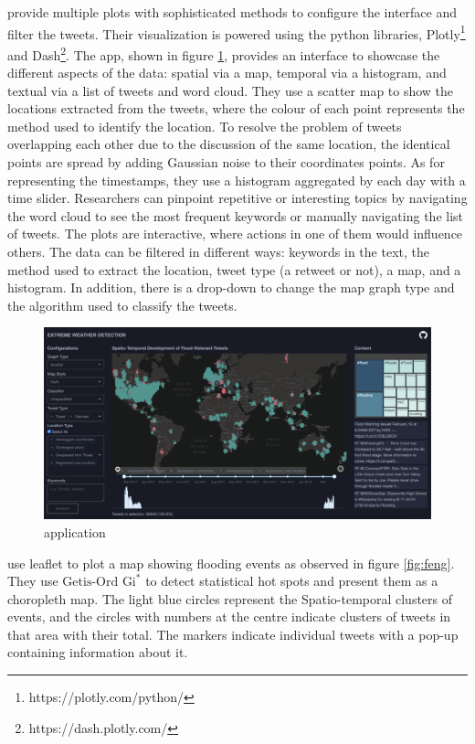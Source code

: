  provide multiple plots with sophisticated
methods to configure the interface and filter the tweets. Their visualization is powered using the python
libraries, Plotly\footnote{https://plotly.com/python/} and Dash\footnote{https://dash.plotly.com/}.
The app, shown in figure \ref{fig:peter}, provides an interface to showcase the different aspects of the
data: spatial via a map, temporal via a histogram, and textual via a list of tweets and word cloud.
They use a scatter map to show the locations extracted from the tweets, where the colour of each
point represents the method used to identify the location. To resolve the problem of tweets
overlapping each other due to the discussion of the same location, the identical points are
spread by adding Gaussian noise to their coordinates points. As for representing the timestamps,
they use a histogram aggregated by each day with a time slider. Researchers can pinpoint repetitive
or interesting topics by navigating the word cloud to see the most frequent keywords or manually
navigating the list of tweets. The plots are interactive, where actions in one of them would
influence others. The data can be filtered in different ways: keywords in the text, the method used
to extract the location, tweet type (a retweet or not), a map, and a histogram. In addition, there is a
drop-down to change the map graph type and the algorithm used to classify the tweets.

\begin{figure}[H]
\begin{center}
  \includegraphics[width=\columnwidth]{./images/peter.png}
\end{center}
\caption{ application}
\label{fig:peter}
\end{figure}

 use leaflet to plot a map showing flooding events as
observed in figure \ref{fig:feng}. They use $\text{Getis-Ord Gi}^{\ast}$ \cite{ordLocalSpatialAutocorrelation2010}
to detect statistical hot spots and present them as a choropleth map. The light blue circles
represent the Spatio-temporal clusters of events, and the circles with numbers at the centre
indicate clusters of tweets in that area with their total. The markers indicate individual tweets
with a pop-up containing information about it.

